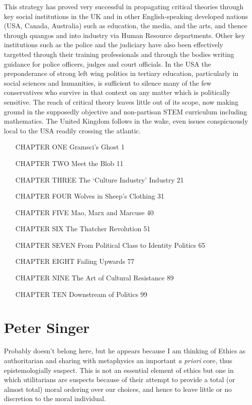 \documentclass[10pt,titlepage]{book}
\begin{document}
This strategy has proved very successful in propagating critical theories through key social institutions in the UK and in other English-speaking developed nations (USA, Canada, Australia) such as education, the media, and the arts, and thence through quangos and into industry via Human Resource departments.
Other key institutions such as the police and the judiciary have also been effectively targetted through their training professionals and through the bodies writing guidance for police officers, judges and court officials.
In the USA the preponderance of strong left wing politics in tertiary education, particularly in social sciences and humanities, is sufficient to silence many of the few conservatives who survive in that context on any matter which is politically sensitive.
The reach of critical theory leaves little out of its scope, now making ground in the supposedly objective and non-partisan STEM curriculum including mathematics.
The United Kingdom follows in the wake, even issues conspicuously local to the USA readily crossing the atlantic.

\begin{itemize}
\item[CHAPTER ONE] Gramsci’s Ghost 1
\item[CHAPTER TWO] Meet the Blob 11
\item[CHAPTER THREE] The ‘Culture Industry’ Industry 21
\item[CHAPTER FOUR] Wolves in Sheep’s Clothing 31
\item[CHAPTER FIVE] Mao, Marx and Marcuse 40
\item[CHAPTER SIX] The Thatcher Revolution 51
\item[CHAPTER SEVEN] From Political Class to Identity Politics 65
\item[CHAPTER EIGHT] Failing Upwards 77
\item[CHAPTER NINE] The Art of Cultural Resistance 89
\item[CHAPTER TEN] Downstream of Politics 99
\end{itemize}

\section{Peter Singer}

Probably doesn't belong here, but he appears because I am thinking of Ethics as authoritarian and sharing with metaphysics an important \emph{a priori} core, thus epistemologially suspect.
This is not an essential element of ethics but one in which utilitarians are suspects because of their attempt to provide a total (or almost total) moral ordering over our choices, and hence to leave little or no discretion to the moral individual.
\end{document}
